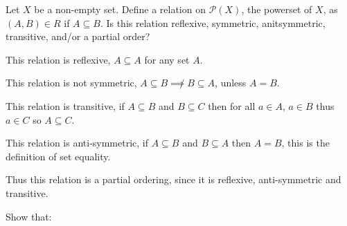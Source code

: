 \documentclass[addpoints]{exam}
\newcommand{\integers}{\mathbb{Z}}
\begin{document}
\begin{questions}

  \question Let $X$ be a non-empty set. Define a relation on $\mathcal{P}(X)$, the powerset of $X$, as $(A,B)\in R$ if $A\subseteq B$. Is this relation reflexive, symmetric, anitsymmetric, transitive, and/or a partial order?
  \vspace*{\fill}
  \begin{solution}
    This relation is reflexive, $A\subseteq A$ for any set $A$.

    This relation is not symmetric, $A\subseteq B \not\implies B\subseteq A$, unless $A= B$.

    This relation is transitive, if $A\subseteq B$ and $B\subseteq C$ then for all $a\in A$, $a\in B$ thus $a\in C$ so $A\subseteq C$.

    This relation is anti-symmetric, if $A\subseteq B$ and $B\subseteq A$ then $A = B$, this is the definition of set equality.

    Thus this relation is a partial ordering, since it is reflexive, anti-symmetric and transitive.
  \end{solution}

  \question Show that:


\end{questions}
\end{document}
